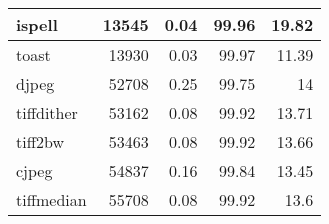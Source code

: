 \begin{tabular}{l|r|r|r|r}
 \hline
 ispell          &   13545 &   0.04 &        99.96 &   19.82 \\
 \hline
 toast           &   13930 &   0.03 &        99.97 &   11.39 \\
 \hline
 djpeg           &   52708 &   0.25 &        99.75 &   14    \\
 \hline
 tiffdither      &   53162 &   0.08 &        99.92 &   13.71 \\
 \hline
 tiff2bw         &   53463 &   0.08 &        99.92 &   13.66 \\
 \hline
 cjpeg           &   54837 &   0.16 &        99.84 &   13.45 \\
 \hline
 tiffmedian      &   55708 &   0.08 &        99.92 &   13.6  \\
\hline
\end{tabular}

